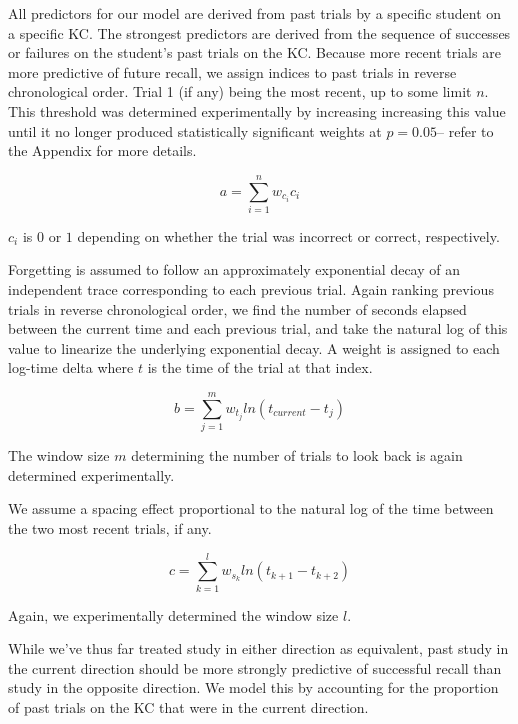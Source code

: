 \documentclass[a4paper,12pt]{article}
\begin{document}
All predictors for our model are derived from past trials by a specific student on a specific KC. The strongest predictors are derived from the sequence of successes or failures on the student's past trials on the KC. Because more recent trials are more predictive of future recall, we assign indices to past trials in reverse chronological order. Trial 1 (if any) being the most recent, up to some limit $n$. This threshold was determined experimentally by increasing increasing this value until it no longer produced statistically significant weights at $p=0.05$-- refer to the Appendix for more details.

\begin{equation}
a = \sum_{i=1}^n w_{c_i} c_i
\end{equation}

$c_i$ is $0$ or $1$ depending on whether the trial was incorrect or correct, respectively.

Forgetting is assumed to follow an approximately exponential decay of an independent trace corresponding to each previous trial. Again ranking previous trials in reverse chronological order, we find the number of seconds elapsed between the current time and each previous trial, and take the natural log of this value to linearize the underlying exponential decay. A weight is assigned to each log-time delta where $t$ is the time of the trial at that index.

\begin{equation}
b = \sum_{j=1}^m w_{t_j} ln(t_{current}- t_j)
\end{equation}

The window size $m$ determining the number of trials to look back is again determined experimentally.

We assume a spacing effect proportional to the natural log of the time between the two most recent trials, if any.

\begin{equation}
c = \sum_{k=1}^{l} w_{s_k} ln(t_{k+1} - t_{k+2})
\end{equation}

Again, we experimentally determined the window size $l$.
	
While we've thus far treated study in either direction as equivalent, past study in the current direction should be more strongly predictive of successful recall than study in the opposite direction. We model this by accounting for the proportion of past trials on the KC that were in the current direction.
\end{document}
